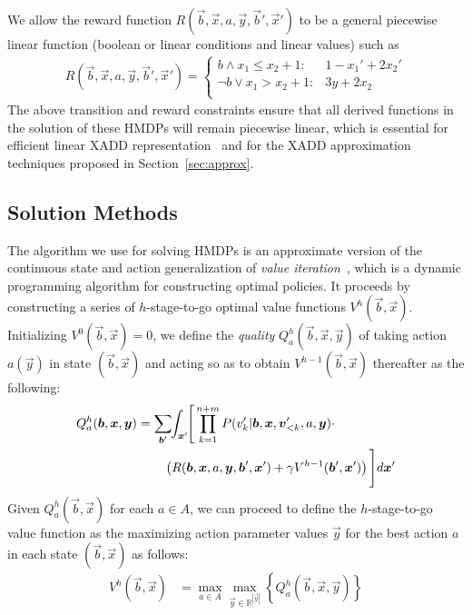 
We allow the reward function
$R(\vec{b},\vec{x},a,\vec{y},\vec{b}',\vec{x}')$ to be a general
piecewise linear function (boolean or linear conditions and linear
values) such as
\begin{align*}
R(\vec{b},\vec{x},a,\vec{y},\vec{b}',\vec{x}') = \begin{cases}
b \land x_1 \leq x_2 \! + \! 1 : & \!\!1 - x_1' + 2x_2' \\
\neg b \lor x_1 > x_2 \! + \! 1:     & \!\!3y + 2x_2 \\
\end{cases} %
\end{align*}%
The above transition and reward constraints ensure that all derived
functions in the solution of these HMDPs will remain piecewise
linear, which is essential for efficient linear XADD 
representation~\cite{sanner_uai11} and for the XADD
approximation techniques proposed in Section~\ref{sec:approx}.

\subsection{Solution Methods}

\label{sec:soln}

The algorithm we use for solving HMDPs is an approximate version of
the continuous state and action generalization of {\it value
iteration}~\cite{bellman}, which is a dynamic programming algorithm
for constructing optimal policies.  It proceeds by constructing a
series of $h$-stage-to-go optimal value functions
$V^h(\vec{b},\vec{x})$.  Initializing $V^0(\vec{b},\vec{x}) = 0$, we
define the \emph{quality} $Q_a^{h}(\vec{b},\vec{x},\vec{y})$ of taking action
$a(\vec{y})$ in state $(\vec{b},\vec{x})$ and acting so as to obtain
$V^{h-1}(\vec{b},\vec{x})$ thereafter as the following:
\vspace{-2.5mm}
{\footnotesize
\begin{align}
Q_a^{h}(\vec{b},\vec{x},\vec{y}) = \sum_{\vec{b}'} & \hspace{-1.0mm} \int_{\vec{x}'} \hspace{-1.0mm} \Bigg[ 
\prod_{k=1}^{n+m} P(v_k'| \vec{b},\vec{x}, \vec{v}'_{<k}, a,\vec{y}) \cdot \label{eq:qfun} \\ 
& \!\!\!\! \left( R(\vec{b},\vec{x},a,\vec{y},\vec{b}',\vec{x}') + \gamma V^{h-1}(\vec{b}',\vec{x}') \right)  \Bigg] d\vec{x}' \nonumber
\end{align}}
Given $Q_a^h(\vec{b},\vec{x})$ for each $a \in A$, we can proceed
to define the $h$-stage-to-go value function as the maximizing action parameter
values $\vec{y}$ for the best action $a$ in each state $(\vec{b},\vec{x})$ as follows:
\begin{align}
V^{h}(\vec{b},\vec{x}) & = \max_{a \in A} \max_{\vec{y} \in \mathbb{R}^{|\vec{y}|}} \left\{ Q^{h}_a(\vec{b},\vec{x},\vec{y}) \right\} \label{eq:vfun}
\end{align}

